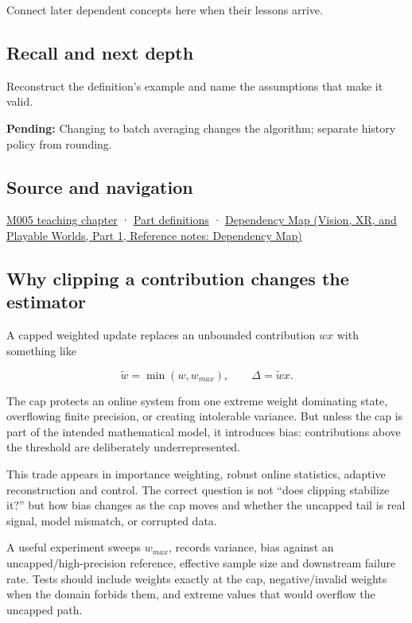 \hypertarget{appendix-1e45d0613db3-used-by}{}

Connect later dependent concepts here when their lessons arrive.

\subsection{Recall and next depth}\label{appendix-1e45d0613db3-recall-and-next-depth}

\hypertarget{appendix-1e45d0613db3-recall-and-next-depth}{}

Reconstruct the definition's example and name the assumptions that make it valid.

\textbf{Pending:} Changing to batch averaging changes the algorithm; separate history policy from rounding.

\subsection{Source and navigation}\label{appendix-1e45d0613db3-source-and-navigation}

\hypertarget{appendix-1e45d0613db3-source-and-navigation}{}

\hyperref[01-foundations-i-ch001-when-arithmetic-meets-uncertainty]{M005 teaching chapter} · \hyperref[appendix-fd090d982a15-m005---parts-77-88]{Part definitions} · \href{../07-Vision-XR-and-Playable-Worlds-P01/main.pdf\#nameddest=appendix-4ad47bdd269a}{Dependency Map (Vision, XR, and Playable Worlds, Part 1, Reference notes: Dependency Map)}

\subsection{Why clipping a contribution changes the estimator}\label{appendix-1e45d0613db3-why-clipping-a-contribution-changes-the-estimator}

\hypertarget{appendix-1e45d0613db3-why-clipping-a-contribution-changes-the-estimator}{}

A capped weighted update replaces an unbounded contribution \(w x\) with something like

\[
\tilde w = \min(w,w_{max}),
\qquad
\Delta = \tilde w x.
\]

The cap protects an online system from one extreme weight dominating state, overflowing finite precision, or creating intolerable variance. But unless the cap is part of the intended mathematical model, it introduces bias: contributions above the threshold are deliberately underrepresented.

This trade appears in importance weighting, robust online statistics, adaptive reconstruction and control. The correct question is not ``does clipping stabilize it?'' but how bias changes as the cap moves and whether the uncapped tail is real signal, model mismatch, or corrupted data.

A useful experiment sweeps \(w_{max}\), records variance, bias against an uncapped/high-precision reference, effective sample size and downstream failure rate. Tests should include weights exactly at the cap, negative/invalid weights when the domain forbids them, and extreme values that would overflow the uncapped path.

